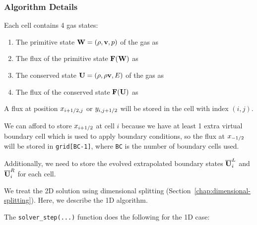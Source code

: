 \subsubsection{Algorithm Details}

Each cell contains 4 gas states:

\begin{enumerate}
\item The primitive state $\mathbf{W} = (\rho, \mathbf{v}, p)$ of the gas as 
\item The flux of the primitive state $\mathbf{F}(\mathbf{W})$ as 
\item The conserved state $\mathbf{U} = (\rho, \rho \mathbf{v}, E)$ of the gas as 
\item The flux of the conserved state $\mathbf{F}(\mathbf{U})$ as 
\end{enumerate}


A flux at position $x_{i+1/2, j}$ or $y_{i, j+1/2}$ will be stored in the
cell with index $(i, j)$.


We can afford to store $x_{i+1/2}$ at cell $i$ because we have at least 1
extra virtual boundary cell which is used to apply boundary conditions, so the
flux at $x_{-1/2}$ will be stored in \verb|grid[BC-1]|, where \texttt{BC} is
the number of boundary cells used.


Additionally, we need to store the evolved extrapolated boundary states
$\overline{\mathbf{U}}_i^L$ and $\overline{\mathbf{U}}_i^R$ for each cell.



We treat the 2D solution using dimensional splitting
(Section~\ref{chap:dimensional-splitting}). Here, we describe the 1D algorithm.

The \verb|solver_step(...)| function does the following for the 1D case:

